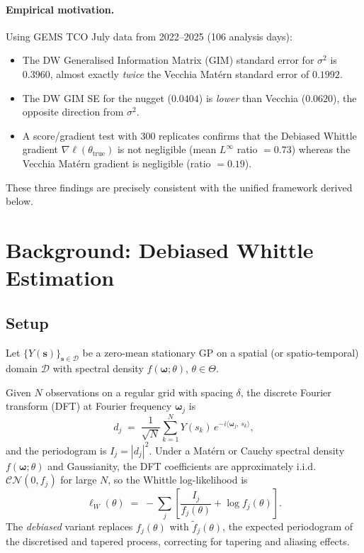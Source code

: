 \documentclass[12pt]{article}
\begin{document}
\paragraph{Empirical motivation.}
Using GEMS TCO July data from 2022--2025 (106 analysis days):
\begin{itemize}
  \item The DW Generalised Information Matrix (GIM) standard error for
        $\sigma^2$ is $0.3960$, almost exactly \emph{twice} the Vecchia
        Matérn standard error of $0.1992$.
  \item The DW GIM SE for the nugget ($0.0404$) is \emph{lower} than
        Vecchia ($0.0620$), the opposite direction from $\sigma^2$.
  \item A score/gradient test with 300 replicates confirms that the
        Debiased Whittle gradient $\nabla\ell(\theta_{\text{true}})$
        is not negligible (mean $L^\infty$ ratio $= 0.73$) whereas
        the Vecchia Matérn gradient is negligible (ratio $= 0.19$).
\end{itemize}
These three findings are precisely consistent with the unified framework
derived below.


\section{Background: Debiased Whittle Estimation}

\subsection{Setup}

Let $\{Y(\mathbf{s})\}_{\mathbf{s}\in\mathcal{D}}$ be a zero-mean
stationary GP on a spatial (or spatio-temporal) domain $\mathcal{D}$
with spectral density $f(\boldsymbol{\omega};\theta)$,
$\theta\in\Theta$.

Given $N$ observations on a regular grid with spacing $\delta$, the
discrete Fourier transform (DFT) at Fourier frequency
$\boldsymbol{\omega}_j$ is
\[
    d_j \;=\; \frac{1}{\sqrt{N}}\sum_{k=1}^N Y(s_k)\,
                e^{-i\langle\boldsymbol{\omega}_j,\,s_k\rangle},
\]
and the periodogram is $I_j = |d_j|^2$.
Under a Matérn or Cauchy spectral density $f(\boldsymbol{\omega};\theta)$
and Gaussianity, the DFT coefficients are approximately i.i.d.\
$\mathcal{CN}(0, f_j)$ for large $N$, so the Whittle log-likelihood is
\[
    \ell_W(\theta) \;=\; -\sum_j \left[
        \frac{I_j}{f_j(\theta)} + \log f_j(\theta)
    \right].
\]
The \emph{debiased} variant \citep{Sykulski2019} replaces $f_j(\theta)$
with $\tilde{f}_j(\theta)$, the expected periodogram of the discretised
and tapered process, correcting for tapering and aliasing effects.
\end{document}
